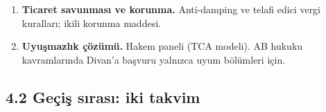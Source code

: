\begin{enumerate}
  \begin{itemize}
  \tightlist
  \item
    Sübvansiyon şeffaflığı ve yasak sübvansiyon listesi (ihracata bağlı destekler).
  \item
    İşleyen bir devlet yardımları denetimi. AB'nin talebi bu; Türkiye'de uygulama ``süresiz ertelenmiş''.
  \item
    TCA md. 411 tipi yeniden dengeleme.
  \end{itemize}
\item
  \textbf{Ticaret savunması ve korunma.} Anti-damping ve telafi edici vergi kuralları; ikili korunma maddesi.
\item
  \textbf{Uyuşmazlık çözümü.} Hakem paneli (TCA modeli). AB hukuku kavramlarında Divan'a başvuru yalnızca uyum bölümleri için.
\end{enumerate}

\hypertarget{02b_secenekler_hukuk-42-geuxe7iux15f-sux131rasux131-iki-takvim}{%
\subsection{4.2 Geçiş sırası: iki takvim}\label{02b_secenekler_hukuk-42-geuxe7iux15f-sux131rasux131-iki-takvim}}

\begingroup\gbtablo\small

